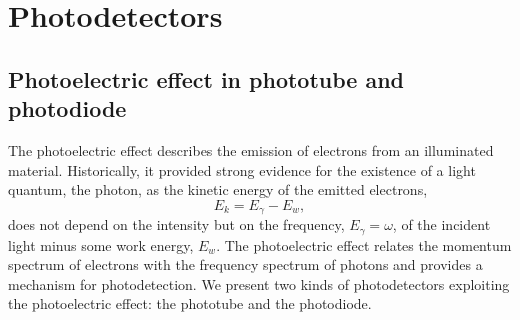 \section{Photodetectors}


\subsection{Photoelectric effect in phototube and photodiode}

The photoelectric effect describes the emission of electrons from an illuminated material.
Historically, it provided strong evidence for the existence of a light quantum, the photon, as the kinetic energy of the emitted electrons,
\begin{equation}
	E_k
	=
	E_\gamma
	-
	E_w
	\label{eq:photoelectric_effect}
	,
\end{equation}
does not depend on the intensity but on the frequency, $E_\gamma=\omega$, of the incident light minus some work energy, $E_w$.
The photoelectric effect relates the momentum spectrum of electrons with the frequency spectrum of photons and provides a mechanism for photodetection.
We present two kinds of photodetectors exploiting the photoelectric effect: the phototube and the photodiode.

